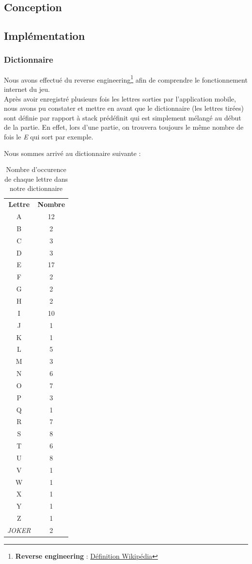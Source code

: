 \documentclass[a4paper,12pt]{article}
\begin{document}
	\subsection{Conception}
	
	\subsection{Implémentation}
		\subsubsection{Dictionnaire}
		Nous avons effectué du reverse engineering\footnote{\textbf{Reverse engineering} :  \href{https://fr.wikipedia.org/wiki/R\%C3\%A9tro-ing\%C3\%A9nierie}{Définition Wikipédia}} afin de comprendre le fonctionnement internet du jeu.\\
		Après avoir enregistré plusieurs fois les lettres sorties par l'application mobile, nous avons pu constater et mettre en avant que le dictionnaire (les lettres tirées) sont définie par rapport à stack prédéfinit qui est simplement mélangé au début de la partie. En effet, lors d'une partie, on trouvera toujours le même nombre de fois le \textit{E} qui sort par exemple.
		
		Nous sommes arrivé au dictionnaire suivante : 
		
		\begin{table}[h]
			\centering
			\begin{tabular}{cc}
				\textbf{Lettre} & \textbf{Nombre} \\
				A     & 12 \\
				B     & 2 \\
				C     & 3 \\
				D     & 3 \\
				E     & 17 \\
				F     & 2 \\
				G     & 2 \\
				H     & 2 \\
				I     & 10 \\
				J     & 1 \\
				K     & 1 \\
				L     & 5 \\
				M     & 3 \\
				N     & 6 \\
				O     & 7 \\
				P     & 3 \\
				Q     & 1 \\
				R     & 7 \\
				S     & 8 \\
				T     & 6 \\
				U     & 8 \\
				V     & 1 \\
				W     & 1 \\
				X     & 1 \\
				Y     & 1 \\
				Z     & 1 \\
				\textit{JOKER} & 2 
			\end{tabular}
			\caption{Nombre d'occurence de chaque lettre dans notre dictionnaire}
		\end{table}
		
\end{document}
